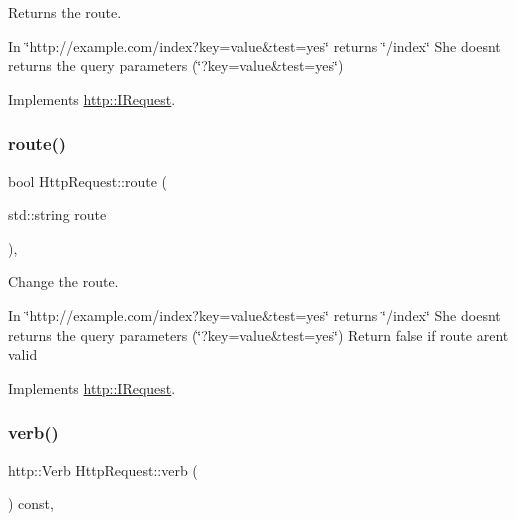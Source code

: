 Returns the route. 

In \char`\"{}http\+://example.\+com/index?key=value\&test=yes\char`\"{} returns \char`\"{}/index\char`\"{} She doesn\textquotesingle{}t returns the query parameters (\char`\"{}?key=value\&test=yes\char`\"{}) 

Implements \hyperlink{structhttp_1_1IRequest_aa7827e21a7d25038ebc1124ae08f02de}{http\+::\+I\+Request}.

\mbox{\label{classHttpRequest_aa71843738db71fe1f826bd30fbf5bb29}} 
\subsubsection{\texorpdfstring{route()}{route()}\hspace{0.1cm}{\footnotesize\ttfamily [2/2]}}
{\footnotesize\ttfamily bool Http\+Request\+::route (\begin{DoxyParamCaption}\item[{std\+::string}]{route }\end{DoxyParamCaption})\hspace{0.3cm}{\ttfamily [virtual]}, {\ttfamily [noexcept]}}



Change the route. 

In \char`\"{}http\+://example.\+com/index?key=value\&test=yes\char`\"{} returns \char`\"{}/index\char`\"{} She doesn\textquotesingle{}t returns the query parameters (\char`\"{}?key=value\&test=yes\char`\"{}) Return false if route aren\textquotesingle{}t valid 

Implements \hyperlink{structhttp_1_1IRequest_a76f3dfba1e9396a0865ea133af371b80}{http\+::\+I\+Request}.

\mbox{\label{classHttpRequest_aded380ba96f29fb1cc6da1679a975dd8}} 
\subsubsection{\texorpdfstring{verb()}{verb()}\hspace{0.1cm}{\footnotesize\ttfamily [1/2]}}
{\footnotesize\ttfamily http\+::\+Verb Http\+Request\+::verb (\begin{DoxyParamCaption}{ }\end{DoxyParamCaption}) const\hspace{0.3cm}{\ttfamily [virtual]}, {\ttfamily [noexcept]}}



